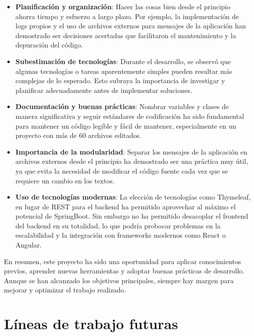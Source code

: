 \documentclass[draft]{scrbook}
\begin{document}
\begin{itemize}
    \item \textbf{Planificación y organización}: Hacer las cosas bien desde el principio ahorra tiempo y esfuerzo a largo plazo. Por ejemplo, la implementación de logs propios y el uso de archivos externos para mensajes de la aplicación han demostrado ser decisiones acertadas que facilitaron el mantenimiento y la depuración del código.
    
    \item \textbf{Subestimación de tecnologías}: Durante el desarrollo, se observó que algunas tecnologías o tareas aparentemente simples pueden resultar más complejas de lo esperado. Esto subraya la importancia de investigar y planificar adecuadamente antes de implementar soluciones.
    
    \item \textbf{Documentación y buenas prácticas}: Nombrar variables y clases de manera significativa y seguir estándares de codificación ha sido fundamental para mantener un código legible y fácil de mantener, especialmente en un proyecto con más de 60 archivos editados.
    
    \item \textbf{Importancia de la modularidad}: Separar los mensajes de la aplicación en archivos externos desde el principio ha demostrado ser una práctica muy útil, ya que evita la necesidad de modificar el código fuente cada vez que se requiere un cambio en los textos.

        \item \textbf{Uso de tecnologías modernas}: La elección de tecnologías como  Thymeleaf, en lugar de REST para el backend ha permitido aprovechar al máximo el potencial de SpringBoot. Sin embargo no ha permitido desacoplar el frontend del backend en su totalidad, lo que podría probocar problemas en  la escalabilidad y la integración con frameworks modernos como React o Angular.
\end{itemize}

En resumen, este proyecto ha sido una oportunidad para aplicar conocimientos previos, aprender nuevas herramientas y adoptar buenas prácticas de desarrollo. Aunque se han alcanzado los objetivos principales, siempre hay margen para mejorar y optimizar el trabajo realizado.

\section{Líneas de trabajo futuras}
\label{futuro}
\end{document}
